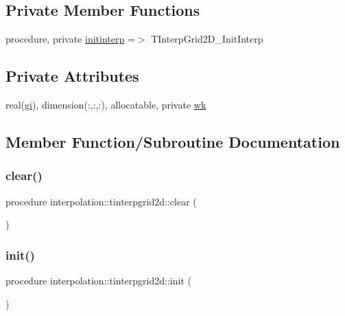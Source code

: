 \subsection*{Private Member Functions}
\begin{DoxyCompactItemize}
\item 
procedure, private \mbox{\hyperlink{structinterpolation_1_1tinterpgrid2d_af83165ec5e23031cd1ff060d98a2ba11}{initinterp}} =$>$ T\+Interp\+Grid2\+D\+\_\+\+Init\+Interp
\end{DoxyCompactItemize}
\subsection*{Private Attributes}
\begin{DoxyCompactItemize}
\item 
real(\mbox{\hyperlink{namespaceinterpolation_a7242dea48715e8170bae81efe12c64be}{gi}}), dimension(\+:,\+:,\+:), allocatable, private \mbox{\hyperlink{structinterpolation_1_1tinterpgrid2d_acb577350f8c843e95b16d7094532af57}{wk}}
\end{DoxyCompactItemize}


\subsection{Member Function/\+Subroutine Documentation}
\mbox{\label{structinterpolation_1_1tinterpgrid2d_af86d878efd2948fcd9db1df2d2c16b58}} 
\subsubsection{\texorpdfstring{clear()}{clear()}}
{\footnotesize\ttfamily procedure interpolation\+::tinterpgrid2d\+::clear (\begin{DoxyParamCaption}{ }\end{DoxyParamCaption})}

\mbox{\label{structinterpolation_1_1tinterpgrid2d_abc095cf68c395b202c78a510d20c7211}} 
\subsubsection{\texorpdfstring{init()}{init()}}
{\footnotesize\ttfamily procedure interpolation\+::tinterpgrid2d\+::init (\begin{DoxyParamCaption}{ }\end{DoxyParamCaption})}

